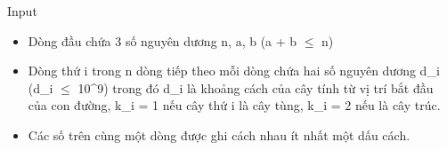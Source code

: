 Input
\begin{itemize}
	\item Dòng đầu chứa 3 số nguyên dương n, a, b (a + b  $\le$  n)
	\item Dòng thứ i trong n dòng tiếp theo mỗi dòng chứa hai số nguyên dương d\_i (d\_i  $\le$  10^9) trong đó d\_i là khoảng cách của cây tính từ vị trí bắt đầu của con đường, k\_i = 1 nếu cây thứ i là cây tùng, k\_i = 2 nếu là cây trúc.
	\item Các số trên cùng một dòng được ghi cách nhau ít nhất một dấu cách.
\end{itemize}